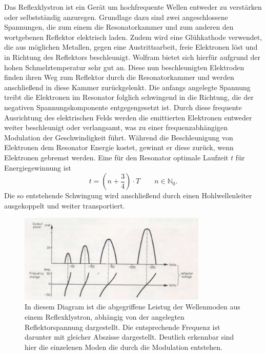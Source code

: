 Das Reflexklystron ist ein Gerät um hochfrequente Wellen entweder zu verstärken oder selbstständig anzuregen. Grundlage dazu sind zwei angeschlossene Spannungen, 
die zum einem die Resonatorkammer und zum anderen den wortgebenen Reflektor elektrisch laden. Zudem wird eine Glühkathode verwendet, die aus möglichen Metallen, 
gegen eine Austrittsarbeit, freie Elektronen löst und in Richtung des Reflektors beschleunigt. Wolfram bietet sich hierfür aufgrund der hohen Schmelztemperatur sehr gut an.
Diese nun beschleunigten Elektroden finden ihren Weg zum Reflektor durch die Resonatorkammer und werden anschließend in diese Kammer zurückgelenkt. Die anfangs angelegte Spannung treibt 
die Elektronen im Resonator folglich schwingend in die Richtung, die der negativen Spannungskomponente entgegengesetzt ist. Durch diese frequente Ausrichtung des elektrischen Felds werden die emittierten Elektronen entweder weiter beschleunigt oder 
verlangsamt, was zu einer frequenzabhängigen Modulation der Geschwindigkeit führt. Während die Beschleunigung von Elektronen dem Resonator Energie kostet, gewinnt er diese zurück, wenn Elektronen gebremst werden. 
Eine für den Resonator optimale Laufzeit $t$ für Energiegewinnung ist 
\begin{equation*}
    t = \left(n+ \frac{3}{4} \right) \cdot T  \quad \quad n \in \mathbb{N}_0.
\end{equation*}
Die so entstehende Schwingung wird anschließend durch einen Hohlwellenleiter ausgekoppelt und weiter transportiert.
\begin{figure}
    \centering
    \includegraphics[width=0.8\textwidth]{Bilder/dia.jpg}
    \caption{In diesem Diagram ist die abgegriffene Leistug der Wellenmoden aus einem Reflexklystron, abhängig von der angelegten Reflektorspannung dargestellt.
    Die entsprechende Frequenz ist darunter mit gleicher Abszisse dargestellt. Deutlich erkennbar sind hier die einzelenen Moden die durch die Modulation entstehen.} 
    \label{fig:ref}
\end{figure}
